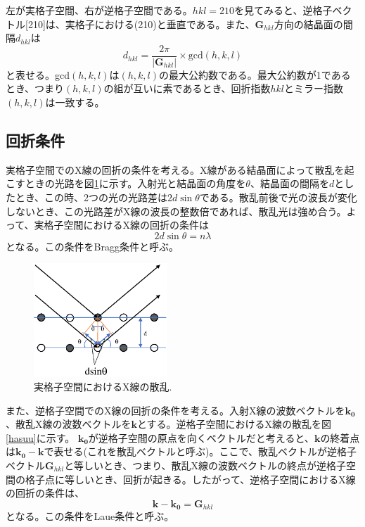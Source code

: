 \documentclass[11pt,a4j,uplatex]{jsarticle}
\begin{document}
\newpage
左が実格子空間、右が逆格子空間である。$hkl=210$を見てみると、逆格子ベクトル[210]は、実格子における(210)と垂直である。また、$\bm{G}_{hkl}$方向の結晶面の間隔$d_{hkl}$は
\begin{equation}
  d_{hkl}=\frac{2\pi}{|\bm{G}_{hkl}|}\times \mathrm{gcd}(h,k,l)
\end{equation}
と表せる。gcd$(h,k,l)$は$(h,k,l)$の最大公約数である。最大公約数が1であるとき、つまり$(h,k,l)$の組が互いに素であるとき、回折指数$hkl$とミラー指数$(h,k,l)$は一致する。



\newpage
\subsection{回折条件}
実格子空間でのX線の回折の条件を考える。X線がある結晶面によって散乱を起こすときの光路を図\ref{dsinq}に示す。入射光と結晶面の角度を$\theta$、結晶面の間隔を$d$としたとき、この時、2つの光の光路差は$2d\sin\theta$である。散乱前後で光の波長が変化しないとき、この光路差がX線の波長の整数倍であれば、散乱光は強め合う。よって、実格子空間におけるX線の回折の条件は
\begin{equation}
 2d\sin\theta=n\lambda
 \label{bragg}
\end{equation}
となる。この条件をBragg条件と呼ぶ。

\begin{figure}[htb]
 \centering
 \includegraphics[clip,width=5cm]{dsinq.eps}
 \caption{実格子空間におけるX線の散乱.}
 \label{dsinq}
\end{figure}

また、逆格子空間でのX線の回折の条件を考える。入射X線の波数ベクトルを$\bm{k_0}$、散乱X線の波数ベクトルを$\bm{k}$とする。逆格子空間におけるX線の散乱を図\ref{hasuu}に示す。
$\bm{k_0}$が逆格子空間の原点を向くベクトルだと考えると、$\bm{k}$の終着点は$\bm{k_0-k}$で表せる(これを散乱ベクトルと呼ぶ)。ここで、散乱ベクトルが逆格子ベクトル$\bm{G}_{hkl}$と等しいとき、つまり、散乱X線の波数ベクトルの終点が逆格子空間の格子点に等しいとき、回折が起きる。したがって、逆格子空間におけるX線の回折の条件は、
\begin{equation}
 \bm{k-k_0}=\bm{G}_{hkl}
 \label{laue}
\end{equation}
となる。この条件をLaue条件と呼ぶ。
\end{document}
